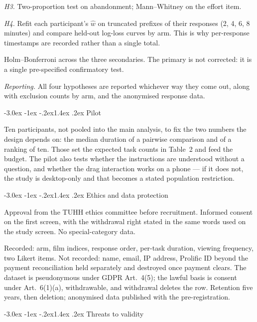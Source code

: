 \documentclass[11pt,a4paper]{article}
\makeatletter
\renewcommand\subsection{\@startsection{subsection}{2}{\z@}%
  {-3.0ex \@plus -1ex \@minus -.2ex}{1.4ex \@plus .2ex}%
  {\normalfont\large\sffamily\bfseries\color{accent}}}
\makeatother
\begin{document}
\emph{H3.} Two-proportion test on abandonment; Mann--Whitney on the effort item.

\emph{H4.} Refit each participant's $\hat{w}$ on truncated prefixes of their
responses (2, 4, 6, 8 minutes) and compare held-out log-loss curves by arm. This
is why per-response timestamps are recorded rather than a single total.

Holm--Bonferroni across the three secondaries. The primary is not corrected: it
is a single pre-specified confirmatory test.

\emph{Reporting.} All four hypotheses are reported whichever way they come out,
along with exclusion counts by arm, and the anonymised response data.

\subsection{Pilot}

Ten participants, not pooled into the main analysis, to fix the two numbers the
design depends on: the median duration of a pairwise comparison and of a
ranking of ten. Those set the expected task counts in Table~2 and feed the
budget. The pilot also tests whether the instructions are understood without a
question, and whether the drag interaction works on a phone --- if it does not,
the study is desktop-only and that becomes a stated population restriction.

\subsection{Ethics and data protection}

Approval from the TUHH ethics committee before recruitment. Informed consent on
the first screen, with the withdrawal right stated in the same words used on the
study screen. No special-category data.

Recorded: arm, film indices, response order, per-task duration, viewing
frequency, two Likert items. Not recorded: name, email, IP address, Prolific ID
beyond the payment reconciliation held separately and destroyed once payment
clears. The dataset is pseudonymous under GDPR Art.~4(5); the lawful basis is
consent under Art.~6(1)(a), withdrawable, and withdrawal deletes the row.
Retention five years, then deletion; anonymised data published with the
pre-registration.

\subsection{Threats to validity}
\label{sec:threats}
\end{document}
